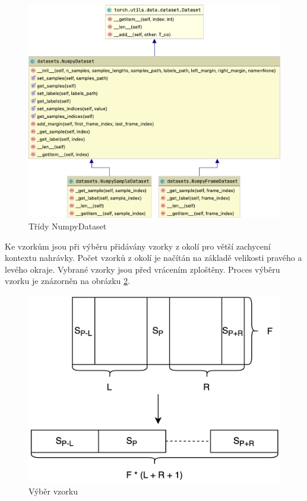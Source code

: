 \documentclass[FM,BP]{tulthesis}
\begin{document}
\begin{figure}[h]
\centerline{\includegraphics[scale=.185]{datasets.png}}
\caption{Třídy NumpyDataset}
\label{fig:numpy_dataset}
\end{figure}
\FloatBarrier

Ke vzorkům jsou při výběru přidávány vzorky z okolí pro větší zachycení kontextu nahrávky. Počet vzorků z okolí je načítán na základě velikosti pravého a levého okraje. Vybrané vzorky jsou před vrácením zploštěny. Proces výběru vzorku je znázorněn na obrázku \ref{fig:sample_selection}.

\begin{figure}[h]
\centerline{\includegraphics[scale=.125]{sample_selection.png}}
\caption{Výběr vzorku}
\label{fig:sample_selection}
\end{figure}
\FloatBarrier
\end{document}
